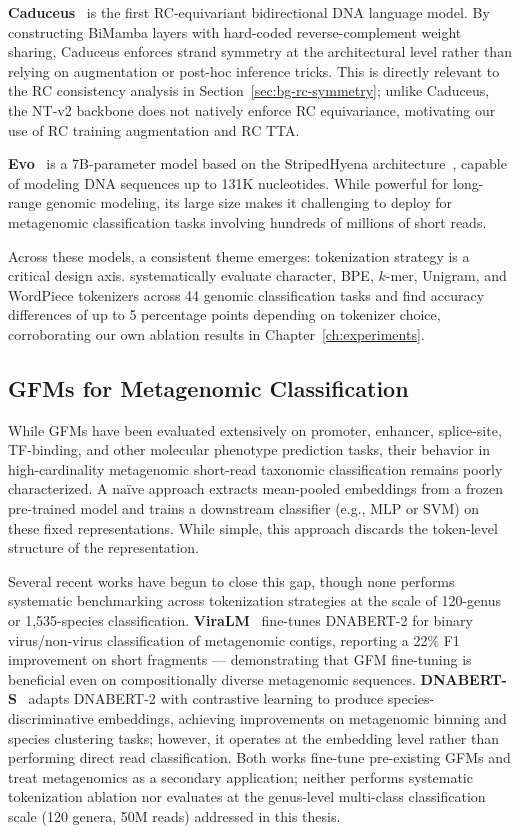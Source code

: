 \textbf{Caduceus}~\cite{Schiff2024caduceus} is the first RC-equivariant bidirectional DNA language model. By constructing BiMamba layers with hard-coded reverse-complement weight sharing, Caduceus enforces strand symmetry at the architectural level rather than relying on augmentation or post-hoc inference tricks. This is directly relevant to the RC consistency analysis in Section~\ref{sec:bg-rc-symmetry}; unlike Caduceus, the NT-v2 backbone does not natively enforce RC equivariance, motivating our use of RC training augmentation and RC TTA.

\textbf{Evo}~\cite{Nguyen2024} is a 7B-parameter model based on the StripedHyena architecture~\cite{Poli2024}, capable of modeling DNA sequences up to 131K nucleotides. While powerful for long-range genomic modeling, its large size makes it challenging to deploy for metagenomic classification tasks involving hundreds of millions of short reads.

Across these models, a consistent theme emerges: tokenization strategy is a critical design axis. \textcite{Lindsey2025tokenizer} systematically evaluate character, BPE, $k$-mer, Unigram, and WordPiece tokenizers across 44 genomic classification tasks and find accuracy differences of up to 5 percentage points depending on tokenizer choice, corroborating our own ablation results in Chapter~\ref{ch:experiments}.

\subsection{GFMs for Metagenomic Classification}
\label{sec:bg-gfm-metagenomics}

While GFMs have been evaluated extensively on promoter, enhancer, splice-site, TF-binding, and other molecular phenotype prediction tasks, their behavior in high-cardinality metagenomic short-read taxonomic classification remains poorly characterized. A naïve approach extracts mean-pooled embeddings from a frozen pre-trained model and trains a downstream classifier (e.g., MLP or SVM) on these fixed representations. While simple, this approach discards the token-level structure of the representation.

Several recent works have begun to close this gap, though none performs systematic benchmarking across tokenization strategies at the scale of 120-genus or 1,535-species classification.
\textbf{ViraLM}~\cite{Peng2024viralm} fine-tunes DNABERT-2 for binary virus/non-virus classification of metagenomic contigs, reporting a 22\% F1 improvement on short fragments — demonstrating that GFM fine-tuning is beneficial even on compositionally diverse metagenomic sequences.
\textbf{DNABERT-S}~\cite{Zhou2025dnaberts} adapts DNABERT-2 with contrastive learning to produce species-discriminative embeddings, achieving improvements on metagenomic binning and species clustering tasks; however, it operates at the embedding level rather than performing direct read classification.
Both works fine-tune pre-existing GFMs and treat metagenomics as a secondary application; neither performs systematic tokenization ablation nor evaluates at the genus-level multi-class classification scale (120 genera, 50M reads) addressed in this thesis.


